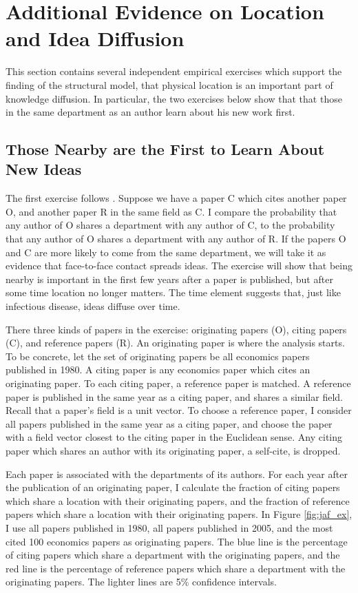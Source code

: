 \section{Additional Evidence on Location and Idea Diffusion}
\label{sec:add_evid}

This section contains several independent empirical exercises which
support the finding of the structural model, that physical location is
an important part of knowledge diffusion. In particular, the two
exercises below show that that those in the same department as an author
learn about his new work first.

\subsection{Those Nearby are the First to Learn About New Ideas}

The first exercise follows \citet{jaffe1993geographic}. Suppose we have 
a paper C which cites another paper O, and another paper R in the same
field as C.  I compare the probability that any author of O shares a
department with any author of C, to the probability that any author of O
shares a department with any author of R.  If the papers O and C are more likely
to come from the same department, we will take it as evidence that
face-to-face contact spreads ideas. The exercise will show that being
nearby is important in the first few years after a paper is published,
but after some time location no longer matters. The time element
suggests that, just like infectious disease, ideas diffuse over time.

There three kinds of papers in the exercise: originating papers (O), citing
papers (C), and reference papers (R). An originating paper is where the analysis
starts. To be concrete, let the set of originating papers be all
economics papers published in 1980. A citing paper is any economics
paper which cites an originating paper. To each citing paper, a
reference paper is matched. A reference paper is published in the same
year as a citing paper, and shares a similar field. Recall that a
paper's field is a unit vector. To choose a reference paper, I consider
all papers published in the same year as a citing paper, and choose the
paper with a field vector closest to the citing paper in the Euclidean
sense. Any citing paper which shares an author with its originating
paper, a self-cite, is dropped.

Each paper is associated with the departments of its authors. For each
year after the publication of an originating paper, I calculate the
fraction of citing papers which share a location with their originating
papers, and the fraction of reference papers which share a location with
their originating papers. In Figure \ref{fig:jaf_ex}, I use all papers published in
1980, all papers published in 2005, and the most cited 100 economics
papers as originating papers. The blue line is the percentage of citing
papers which share a department with the originating papers, and the red
line is the percentage of reference papers which share a department with
the originating papers. The lighter lines are 5\% confidence intervals.

